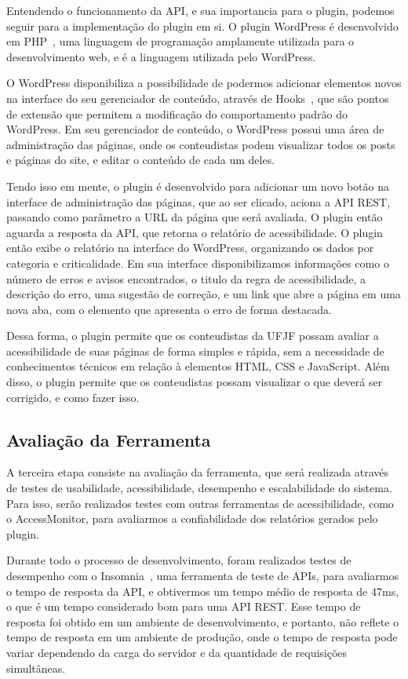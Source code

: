 \documentclass[12pt]{article}
\begin{document}
Entendendo o funcionamento da API, e sua importancia para o
plugin, podemos seguir para a implementação do plugin em si. O plugin WordPress
é desenvolvido em PHP~\autocite{php}, uma linguagem de programação amplamente utilizada
para o desenvolvimento web, e é a linguagem utilizada pelo WordPress. 

O WordPress disponibiliza a possibilidade de podermos adicionar elementos novos na interface
do seu gerenciador de conteúdo, através de Hooks~\autocite{hooks}, que são pontos
de extensão que permitem a modificação do comportamento padrão do WordPress. Em seu
gerenciador de conteúdo, o WordPress possui uma área de administração das páginas, onde
os conteudistas podem visualizar todos os posts e páginas do site, e editar o conteúdo
de cada um deles.

Tendo isso em mente, o plugin é desenvolvido para adicionar um novo botão na
interface de administração das páginas, que ao ser clicado, aciona a API REST,
passando como parâmetro a URL da página que será avaliada. O plugin então
aguarda a resposta da API, que retorna o relatório de acessibilidade. O plugin
então exibe o relatório na interface do WordPress, organizando os dados
por categoria e criticalidade. Em sua interface disponibilizamos informações 
como o número de erros e avisos encontrados,
o titulo da regra de acessibilidade, a descrição do erro, uma sugestão de correção,
e um link que abre a página em uma nova aba, com o elemento que apresenta o erro de 
forma destacada.

Dessa forma, o plugin permite que os conteudistas da UFJF possam avaliar a
acessibilidade de suas páginas de forma simples e rápida, sem a necessidade
de conhecimentos técnicos em relação à elementos HTML, CSS e JavaScript.
Além disso, o plugin permite que os conteudistas possam visualizar o que 
deverá ser corrigido, e como fazer isso.

\subsection{Avaliação da Ferramenta}
A terceira etapa consiste na avaliação da ferramenta, que será realizada
através de testes de usabilidade, acessibilidade, desempenho e escalabilidade
do sistema. Para isso, serão realizados testes com outras ferramentas de
acessibilidade, como o AccessMonitor, para avaliarmos a
confiabilidade dos relatórios gerados pelo plugin. 

Durante todo o processo
de desenvolvimento, foram realizados testes de desempenho com o Insomnia~\autocite{insomnia},
uma ferramenta de teste de APIs, para avaliarmos o tempo de resposta da API,
e obtivermos um tempo médio de resposta de 47ms, o que é um tempo considerado
bom para uma API REST. Esse tempo de resposta foi obtido em um ambiente
de desenvolvimento, e portanto, não reflete o tempo de resposta em um
ambiente de produção, onde o tempo de resposta pode variar dependendo da
carga do servidor e da quantidade de requisições simultâneas.
\end{document}
